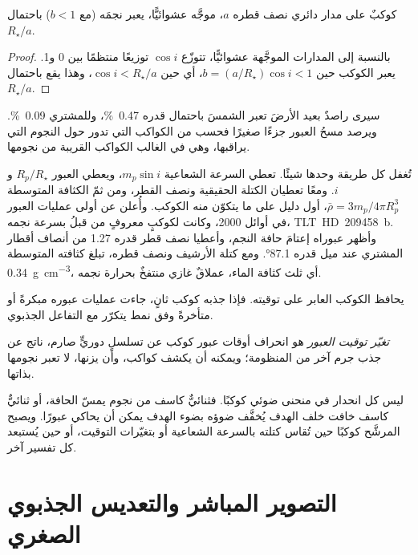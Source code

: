 \begin{proposition}\label{prop:b3:exoplanets:probability}
كوكبٌ على مدار دائري نصف قطره $a$، موجَّه عشوائيًّا، يعبر
نجمَه (مع $b < 1$) باحتمال $R_\star/a$.
\end{proposition}

\begin{proof}
بالنسبة إلى المدارات الموجَّهة عشوائيًّا، تتوزّع $\cos i$ توزيعًا منتظمًا بين
0 و1. يعبر الكوكب حين $b = (a/R_\star)\cos i < 1$، أي
حين $\cos i < R_\star/a$، وهذا يقع باحتمال $R_\star/a$.
\end{proof}

سيرى راصدٌ بعيد الأرضَ تعبر الشمسَ باحتمال
قدره \qty{0.47}{\percent}، وللمشتري \qty{0.09}{\percent}. ويرصد مسحُ العبور
جزءًا صغيرًا فحسب من الكواكب التي تدور حول النجوم التي يراقبها،
وهي في الغالب الكواكب القريبة من نجومها.

تُغفل كل طريقة وحدها شيئًا. تعطي السرعة الشعاعية
$m_p\sin i$، ويعطي العبور $R_p/R_\star$ و$i$. ومعًا تعطيان
الكتلة الحقيقية ونصف القطر، ومن ثمّ الكثافة المتوسطة
$\bar\rho = 3m_p/4\pi R_p^3$، أول دليل على ما يتكوّن منه الكوكب.
وأُعلن عن أولى عمليات العبور في أوائل 2000، وكانت لكوكبٍ
معروفٍ من قبلُ بسرعة نجمه، \mbox{\textdir TLT HD~209458~b}. وأظهر عبوراه
إعتامَ حافة النجم، وأعطيا نصف قطر قدره 1.27 من أنصاف أقطار المشتري عند ميل
قدره \ang{87.1}. ومع كتلة الأرشيف ونصف قطره، تبلغ كثافته المتوسطة
\qty{0.34}{g.cm^{-3}}، أي ثلث كثافة الماء، عملاقٌ غازي منتفخٌ
بحرارة نجمه.

يحافظ الكوكب العابر على توقيته. فإذا جذبه كوكب ثانٍ، جاءت عمليات عبوره
مبكرةً أو متأخرةً وفق نمط يتكرّر مع التفاعل
الجذبوي.

\begin{definition}\label{def:b3:exoplanets:ttv}
\emph{تغيّر توقيت العبور} هو
انحراف أوقات عبور كوكب عن تسلسلٍ دوريٍّ صارم،
ناتج عن جذب جرم آخر من
المنظومة؛ ويمكنه أن يكشف كواكب، وأن يزنها، لا تعبر
نجومها بذاتها.
\end{definition}

ليس كل انحدار في منحنى ضوئي كوكبًا. فثنائيٌّ كاسف من نجوم يمسّ
الحافة، أو ثنائيٌّ كاسف خافت خلف الهدف يُخفَّف ضوؤه بضوء الهدف
يمكن أن يحاكي عبورًا. ويصبح المرشَّح كوكبًا حين تُقاس كتلته
بالسرعة الشعاعية أو بتغيّرات التوقيت،
أو حين يُستبعد كل تفسير آخر.

\section{التصوير المباشر والتعديس الجذبوي الصغري}\label{sec:b3:exoplanets:imaging}

